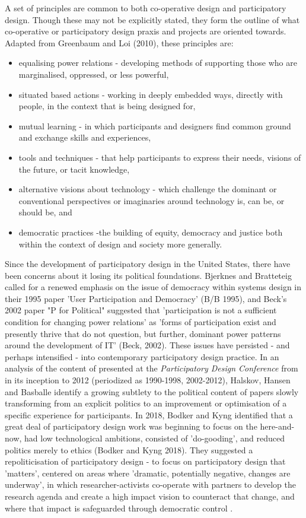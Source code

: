 A set of principles are common to both co-operative design and participatory design. Though these may not be explicitly stated, they form the outline of what co-operative or participatory design praxis and projects are oriented towards. Adapted from Greenbaum and Loi (2010), these principles are:
\begin{itemize}
\item equalising power relations - developing methods of supporting those who are marginalised, oppressed, or less powerful,
\item situated based actions - working in deeply embedded ways, directly with people, in the context that is being designed for,
\item mutual learning - in which participants and designers find common ground and exchange skills and experiences,
\item tools and techniques - that help participants to express their needs, visions of the future, or tacit knowledge,
\item alternative visions about technology - which challenge the dominant or conventional perspectives or imaginaries around technology is, can be, or should be, and
\item democratic practices -the building of equity, democracy and justice both within the context of design and society more generally.
\end{itemize}

Since the development of participatory design in the United States, there have been concerns about it losing its political foundations. Bjerknes and Bratteteig called for a renewed emphasis on the issue of democracy within systems design in their 1995 paper 'User Participation and Democracy' (B/B 1995), and Beck's 2002 paper "P for Political" suggested that 'participation is not a sufficient condition for changing power relations' as 'forms of participation exist and presently thrive that do not question, but further, dominant power patterns around the development of IT' (Beck, 2002). These issues have persisted - and perhaps intensified - into contemporary participatory design practice. In an analysis of the content of presented at the \textit{Participatory Design Conference} from in its inception to 2012 (periodized as 1990-1998, 2002-2012)\cite{halskov_diversity_2015, basballe_early_2016}, Halskov, Hansen and Basballe identify a growing subtlety to the political content of papers  slowly transforming from an explicit politics to an improvement or optimisation of a specific experience for participants. In 2018, Bodker and Kyng identified that a great deal of participatory design work was beginning to focus on the here-and-now, had low technological ambitions, consisted of 'do-gooding', and reduced politics merely to ethics (Bodker and Kyng 2018). They suggested a repoliticisation of participatory design - to focus on participatory design that 'matters', centered on areas where 'dramatic, potentially negative, changes are underway', in which researcher-activists co-operate with partners to develop the research agenda and create a high impact vision to counteract that change, and where that impact is safeguarded through democratic control \cite{bodker_participatory_2018}. 

